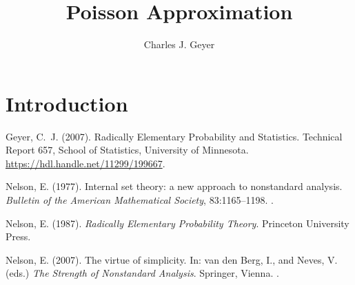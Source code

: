 \documentclass[11pt]{article}
\begin{document}
\title{Poisson Approximation}

\author{Charles J. Geyer}

\maketitle

\section{Introduction}

\begin{thebibliography}{}

Geyer, C.~J. (2007).
\newblock Radically Elementary Probability and Statistics.
\newblock Technical Report 657, School of Statistics, University of Minnesota. 
\newblock \url{https://hdl.handle.net/11299/199667}.

Nelson, E. (1977).
\newblock Internal set theory: a new approach to nonstandard analysis.
\newblock \emph{Bulletin of the American Mathematical Society}, 83:1165--1198.
\newblock {}.

Nelson, E. (1987).
\newblock \emph{Radically Elementary Probability Theory}.
\newblock Princeton University Press.

Nelson, E. (2007).
\newblock The virtue of simplicity.
\newblock In: van den Berg, I., and Neves, V. (eds.)
    \emph{The Strength of Nonstandard Analysis}.
\newblock Springer, Vienna.
\newblock {}.

\end{thebibliography}
\end{document}
